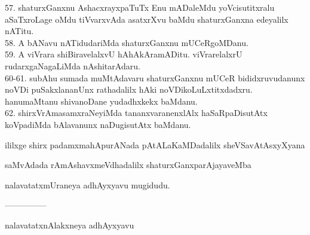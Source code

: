 \documentclass{article}
\begin{document}
57. shaturxGanxnu AshacxrayxpaTuTx Enu mADaleMdu yoVcisutitxralu aSaTxroLage oMdu tiVvarxvAda asatxrXvu baMdu shaturxGanxna edeyalilx nATitu.\\
58. A bANavu nATidudariMda shaturxGanxnu mUCeRgoMDanu.\\
59. A viVrara shiBiravelalxvU hAhAkAramADitu. viVrarelalxrU rudarxgaNagaLiMda nAshitarAdaru.\\
60-61. subAhu sumada muMtAdavaru shaturxGanxnu mUCeR bididxruvudanunx noVDi puSakxlananUnx rathadalilx hAki noVDikoLuLxtitxdadxru. hanumaMtanu shivanoDane yudadhxkekx baMdanu.\\
62. shirxVrAmasamxraNeyiMda tananxvaranenxlAlx haSaRpaDisutAtx koVpadiMda bAlavanunx naDugisutAtx baMdanu.

\begin{center}
ililxge shirx padamxmahApurANada pAtALaKaMDadalilx sheVSavAtAsxyXyana
\end{center}

\begin{center}
saMvAdada rAmAshavxmeVdhadalilx shaturxGanxparAjayaveMba
\end{center}

\begin{center}
nalavatatxmUraneya adhAyxyavu mugidudu.
\end{center}

\begin{center}
---------------
\end{center}

\begin{center}
nalavatatxnAlakxneya adhAyxyavu
\end{center}
\end{document}
